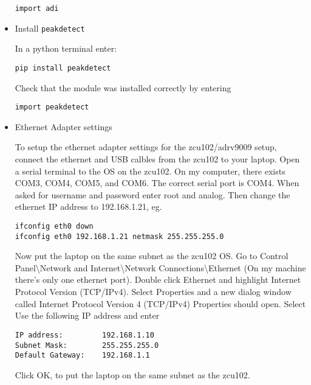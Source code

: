 \documentclass[10pt,twoside]{article}
\begin{document}
\begin{itemize}
\begin{verbatim}
import adi
\end{verbatim}

\item Install \verb+peakdetect+

In a python terminal enter:
\begin{verbatim}
pip install peakdetect
\end{verbatim}

Check that the module was installed correctly by entering

\begin{verbatim}
import peakdetect
\end{verbatim}

\item Ethernet Adapter settings

To setup the ethernet adapter settings for the zcu102/adrv9009 setup, connect the ethernet and USB calbles from the zcu102 to your laptop.  Open a serial terminal to the OS on the zcu102.  On my computer, there exists COM3, COM4, COM5, and COM6.  The correct serial port is COM4.  When asked for username and password enter root and analog.  Then change the ethernet IP address to 192.168.1.21, eg.

\begin{verbatim}
ifconfig eth0 down
ifconfig eth0 192.168.1.21 netmask 255.255.255.0
\end{verbatim}

Now put the laptop on the same subnet as the zcu102 OS.  Go to Control Panel\textbackslash Network and Internet\textbackslash Network Connections\textbackslash Ethernet (On my machine there's only one ethernet port).  Double click Ethernet and highlight Internet Protocol Version (TCP/IPv4).  Select Properties and a new dialog window called Internet Protocol Version 4 (TCP/IPv4) Properties should open.  Select Use the following IP address  and enter
\begin{verbatim}
IP address: 		192.168.1.10
Subnet Mask: 		255.255.255.0
Default Gateway:	192.168.1.1
\end{verbatim}

Click OK, to put the laptop on the same subnet as the zcu102.









\end{itemize}

\end{document}
